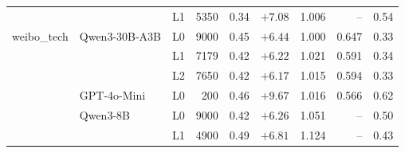 \begin{table}[h]
\begin{tabular}{lllrrrrrr}
 &  & L1 & 5350 & 0.34 & $+7.08$ & 1.006 & -- & 0.54 \\
weibo\_tech & Qwen3-30B-A3B & L0 & 9000 & 0.45 & $+6.44$ & 1.000 & 0.647 & 0.33 \\
 &  & L1 & 7179 & 0.42 & $+6.22$ & 1.021 & 0.591 & 0.34 \\
 &  & L2 & 7650 & 0.42 & $+6.17$ & 1.015 & 0.594 & 0.33 \\
 & GPT-4o-Mini & L0 & 200 & 0.46 & $+9.67$ & 1.016 & 0.566 & 0.62 \\
 & Qwen3-8B & L0 & 9000 & 0.42 & $+6.26$ & 1.051 & -- & 0.50 \\
 &  & L1 & 4900 & 0.49 & $+6.81$ & 1.124 & -- & 0.43 \\
\bottomrule
\end{tabular}
\end{table}
